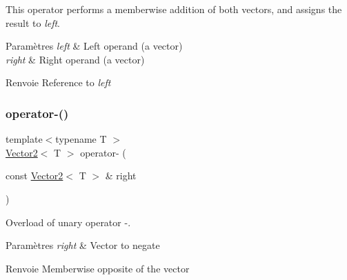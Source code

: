 This operator performs a memberwise addition of both vectors, and assigns the result to {\itshape left}.


\begin{DoxyParams}{Paramètres}
{\em left} & Left operand (a vector) \\
\hline
{\em right} & Right operand (a vector)\\
\hline
\end{DoxyParams}
\begin{DoxyReturn}{Renvoie}
Reference to {\itshape left} 
\end{DoxyReturn}
\mbox{\label{classsf_1_1Vector2_a3885c2e66dc427cec7eaa178d59d8e8b}} 
\subsubsection{\texorpdfstring{operator-\/()}{operator-()}\hspace{0.1cm}{\footnotesize\ttfamily [1/2]}}
{\footnotesize\ttfamily template$<$typename T $>$ \\
\hyperlink{classsf_1_1Vector2}{Vector2}$<$ T $>$ operator-\/ (\begin{DoxyParamCaption}\item[{const \hyperlink{classsf_1_1Vector2}{Vector2}$<$ T $>$ \&}]{right }\end{DoxyParamCaption})\hspace{0.3cm}{\ttfamily [related]}}



Overload of unary operator -\/. 


\begin{DoxyParams}{Paramètres}
{\em right} & Vector to negate\\
\hline
\end{DoxyParams}
\begin{DoxyReturn}{Renvoie}
Memberwise opposite of the vector 
\end{DoxyReturn}
\mbox{\label{classsf_1_1Vector2_ad027adae53ec547a86c20deeb05c9e85}} 
